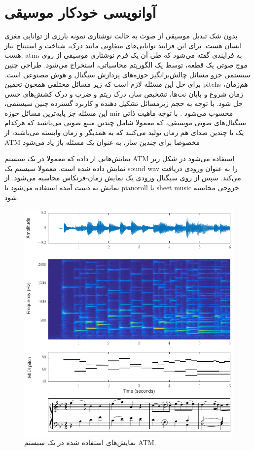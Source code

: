 \section{آوانویسی خودکار موسیقی}
بدون شک تبدیل موسیقی از صوت به حالت نوشتاری نمونه بارزی از توانایی مغزی انسان
هست. برای این فرایند توانایی‌های متفاوتی مانند درک، شناخت و استنتاج نیاز هست.
\gls{atm}، به فرایندی گفته می‌شود که طی آن یک فرم نوشتاری موسیقی از روی موج صوتی
یک قطعه، توسط یک الگوریتم محاسباتی، استخراج می‌شود. طراحی چنین سیستمی جزو مسائل
چالش‌برانگیز حوزه‌های پردازش سیگنال و هوش مصنوعی است. برای حل این مسئله لازم است
که زیر مسائل مختلفی همچون تخمین \glspl{pitch} هم‌زمان، زمان شروع و پایان نت‌ها،
تشخیص ساز، درک ریتم و ضرب و درک کشش‌های حسی حل شود. با توجه به حجم زیرمسائل
تشکیل دهنده و کاربرد گسترده چنین سیستمی، این مسئله جز پایه‌ترین مسائل حوزه
\gls{mir} محسوب می‌شود \cite{klapuri2007signal,benetos2013automatic}. با توجه
ماهیت ذاتی سیگنال‌های صوتی موسیقی، که معمولا شامل چندین منبع صوتی می‌باشند که
هرکدام یک یا چندین صدای هم زمان تولید می‌کنند که به همدیگر و زمان وابسته
می‌باشند، از \gls{ATM} مخصوصا برای چندین ساز، به عنوان یک مسئله باز یاد می‌شود
\cite{benetos2013automatic}

نمایش‌هایی از داده که معمولا در یک سیستم \gls{ATM} استفاده می‌شود در شکل زیر
نمایش داده شده است. معمولا سیستم یک \gls{sound wav} را به عنوان ورودی دریافت
می‌کند. سپس از روی سیگنال ورودی یک نمایش زمان-فرنکاس محاسبه می‌شود. از نمایش به
دست آمده استفاده می‌شود تا \gls{pianoroll} یا \gls{sheet music} خروجی محاسبه
شود.
\begin{figure}[]
    \centering
    \includegraphics[width=12cm]{./statics/atm_data.png}
    \caption{نمایش‌های استفاده شده در یک سیستم \gls{ATM}.}
\end{figure}

